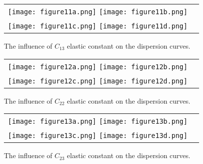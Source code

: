 \documentclass[]{spie}  %
\newcommand{\myfigscale}{0.9}
\begin{document}
\begin{figure} [ht]
	\begin{center}
		\begin{tabular}{cc} %
			\texttt{[image: figure11a.png]}
			\texttt{[image: figure11b.png]}\\
			\texttt{[image: figure11c.png]}
			\texttt{[image: figure11d.png]}
		\end{tabular}
	\end{center}
	\caption[] 
	{ \label{fig:C13} 
		The influence of \(C_{13}\) elastic constant on the dispersion curves.}
\end{figure} 

\begin{figure} [ht]
	\begin{center}
		\begin{tabular}{cc} %
			\texttt{[image: figure12a.png]}
			\texttt{[image: figure12b.png]}\\
			\texttt{[image: figure12c.png]}
			\texttt{[image: figure12d.png]}
		\end{tabular}
	\end{center}
	\caption[] 
	{ \label{fig:C22} 
		The influence of \(C_{22}\) elastic constant on the dispersion curves.}
\end{figure} 

\begin{figure} [ht]
	\begin{center}
		\begin{tabular}{cc} %
			\texttt{[image: figure13a.png]}
			\texttt{[image: figure13b.png]}\\
			\texttt{[image: figure13c.png]}
			\texttt{[image: figure13d.png]}
		\end{tabular}
	\end{center}
	\caption[] 
	{ \label{fig:C23} 
		The influence of \(C_{23}\) elastic constant on the dispersion curves.}
\end{figure} 
\end{document}

